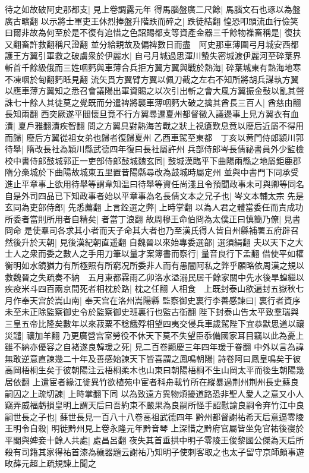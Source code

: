 待之如故破阿史那都支|{
	見上卷調露元年}
得馬腦盤廣二尺餘|{
	馬腦文石也琢以為盤廣古曠翻}
以示將士軍吏王休烈捧盤升階跌而碎之|{
	跌徒結翻}
惶恐叩頭流血行儉笑曰爾非故為何至於是不復有追惜之色詔賜都支等資產金器三千餘物襍畜稱是|{
	復扶又翻畜許救翻稱尺證翻}
並分給親故及偏禆數日而盡　阿史那車薄圍弓月城安西都護王方翼引軍救之破虜衆於伊麗水|{
	自弓月城過思渾川蟄失密城渡伊麗河至碎葉界}
斬首千餘級俄而三姓咽麫與車薄合兵拒方翼方翼與戰於熱海|{
	碎葉城東有熱海地寒不凍咽於甸翻麫眡見翻}
流矢貫方翼臂方翼以佩刀截之左右不知所將胡兵謀執方翼以應車薄方翼知之悉召會議陽出軍資賜之以次引出斬之會大風方翼振金鼔以亂其聲誅七十餘人其徒莫之覺既而分遣禆將襲車薄咽麫大破之擒其酋長三百人|{
	酋慈由翻長知兩翻}
西突厥遂平閻懷旦竟不行方翼尋遷夏州都督徵入議邊事上見方翼衣有血漬|{
	夏戶雅翻漬疾智翻}
問之方翼具對熱海苦戰之狀上視瘡歎息竟以廢后近屬不得用而歸|{
	廢后方翼從祖女弟也歸者復歸夏州}
乙酉車駕至東都　丁亥以黄門侍郎潁川郭待舉|{
	隋改長社為穎川縣武德四年復曰長社屬許州}
兵部侍郎岑長倩祕書員外少監檢校中書侍郎鼓城郭正一吏部侍郎鼔城魏玄同|{
	鼓城漢臨平下曲陽兩縣之地屬鉅鹿郡隋分槀城於下曲陽故城東五里置昔陽縣尋改為鼓城時屬定州}
並與中書門下同承受進止平章事上欲用待舉等謂韋知温曰待舉等資任尚淺且令預聞政事未可與卿等同名自是外司四品已下知政事者始以平章事為名長倩文本之兄子也|{
	岑文本輔太宗}
先是玄同為吏部侍郎|{
	先悉薦翻}
上言銓選之弊|{
	上時掌翻}
以為人君之體當委任而責成功所委者當則所用者自精矣|{
	者當丁浪翻}
故周穆王命伯冏為太僕正曰慎簡乃僚|{
	見書冏命}
是使羣司各求其小者而天子命其大者也乃至漢氏得人皆自州縣補署五府辟召然後升於天朝|{
	見後漢紀朝直遥翻}
自魏晉以來始專委選部|{
	選須絹翻}
夫以天下之大士人之衆而委之數人之手用刀筆以量才案簿書而察行|{
	量音良行下孟翻}
借使平如權衡明如水鏡猶力有所極照有所窮况所委非人而有愚闇阿私之弊乎願略依周漢之規以救魏晉之失疏奏不納　五月東都霖雨乙卯洛水溢溺民居千餘家關中先水後旱蝗繼以疾疫米斗四百兩京間死者相枕於路|{
	枕之任翻}
人相食　上既封泰山欲遍封五嶽秋七月作奉天宫於嵩山南|{
	奉天宫在洛州嵩陽縣}
監察御史裏行李善感諫曰|{
	裏行者資序未至未正除監察御史令於監察御史班裏行也監古衘翻}
陛下封泰山告太平致羣瑞與三皇五帝比隆矣數年以來菽粟不稔餓殍相望四夷交侵兵車歲駕陛下宜恭默思道以禳災譴|{
	禳加羊翻}
乃更廣營宫室勞役不休天下莫不失望臣忝備國家耳目竊以此為憂上雖不納亦優容之自褚遂良韓瑗之死|{
	見二百卷顯慶三年四年瑗于眷翻}
中外以言為諱無敢逆意直諫幾二十年及善感始諫天下皆喜謂之鳳鳴朝陽|{
	詩卷阿曰鳳皇鳴矣于彼高岡梧桐生矣于彼朝陽注云梧桐柔木也山東曰朝陽梧桐不生山岡太平而後生朝陽幾居依翻}
上遣宦者緣江徙異竹欲植苑中宦者科舟載竹所在縱暴過荆州荆州長史蘇良嗣囚之上疏切諫|{
	上時掌翻下同}
以為致遠方異物煩擾道路恐非聖人愛人之意又小人竊弄威福虧損皇明上謂天后曰吾約束不嚴果為良嗣所怪手詔慰諭良嗣令弃竹江中良嗣世長之子也|{
	蘇世長見一百八十八卷高祖武德四年}
黔州都督謝祐希天后意逼零陵王明令自殺|{
	明徙黔州見上卷永隆元年黔音琴}
上深惜之黔府官屬皆坐免官祐後寑於平閣與婢妾十餘人共處|{
	處昌呂翻}
夜失其首垂拱中明子零陵王俊黎國公傑為天后所殺有司籍其家得祐首漆為穢器題云謝祐乃知明子使刺客取之也太子留守京師頗事遊畋薛元超上疏規諫上聞之

